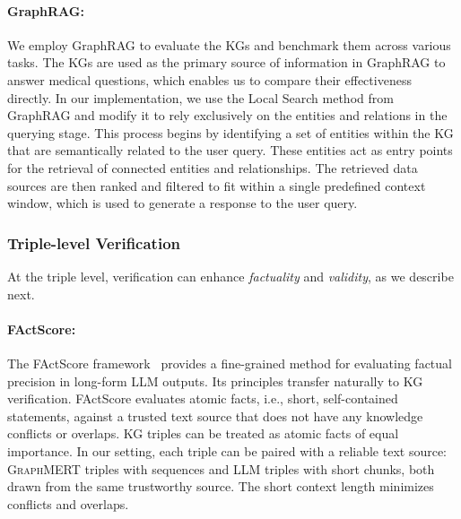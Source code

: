 \documentclass[10pt]{article}
\newcommand{\ours}{\textsc{GraphMERT}\xspace}
\begin{document}
\paragraph{GraphRAG:}
We employ GraphRAG to evaluate the KGs and benchmark them across various tasks. The KGs are used as the primary source of information in GraphRAG to answer medical questions, which enables us to compare their effectiveness directly.
In our implementation, we use the Local Search method from GraphRAG and modify it to rely exclusively on the entities and relations in the querying stage. This process begins by identifying a set of entities within the KG that are semantically related to the user query. These entities act as entry points for the retrieval of connected entities and relationships. The retrieved data sources are then ranked and filtered to fit within a single predefined context window, which is used to generate a response to the user query.

\subsubsection{Triple-level Verification}
At the triple level, verification can enhance \emph{factuality} and \emph{validity}, as we describe next. 

\paragraph{FActScore:} 
The FActScore framework~\cite{min-factscore} provides a fine-grained method for evaluating factual precision in long-form LLM outputs. Its principles transfer naturally to KG verification. FActScore evaluates atomic facts, i.e., short, self-contained statements, against a trusted text source that does not have any knowledge conflicts or overlaps. KG triples can be treated as atomic facts of equal importance. In our setting, each triple can be paired with a reliable text source: \ours triples with sequences and LLM triples with short chunks, both drawn from the same trustworthy source. The short context length minimizes conflicts and overlaps.
\end{document}
